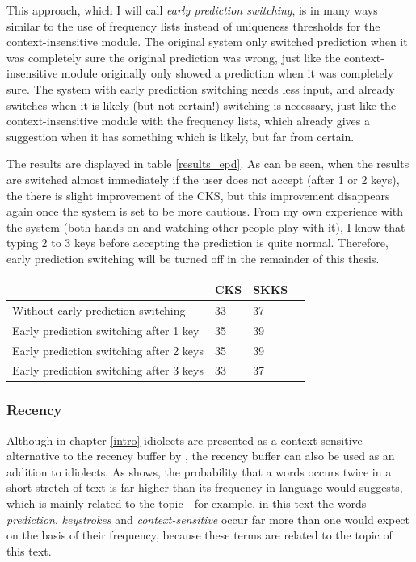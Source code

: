 \documentclass[12pt]{article}
\let\originaltable\table
\let\endoriginaltable\endtable
\renewenvironment{table}[1][ht]{%
  \originaltable[#1]
  \centering}%
  {\endoriginaltable}
\begin{document}
This approach, which I will call \emph{early prediction switching}, is in many ways similar to the use of frequency lists instead of uniqueness thresholds for the context-insensitive module. The original system only switched prediction when it was completely sure the original prediction was wrong, just like the context-insensitive module originally only showed a prediction when it was completely sure. The system with early prediction switching needs less input, and already switches when it is likely (but not certain!) switching is necessary, just like the context-insensitive module with the frequency lists, which already gives a suggestion when it has something which is likely, but far from certain.

The results are displayed in table \ref{results_epd}. As can be seen, when the results are switched almost immediately if the user does not accept (after 1 or 2 keys), the there is slight improvement of the CKS, but this improvement disappears again once the system is set to be more cautious. From my own experience with the system (both hands-on and watching other people play with it), I know that typing 2 to 3 keys before accepting the prediction is quite normal. Therefore, early prediction switching will be turned off in the remainder of this thesis.

\begin{table}[h]
\begin{tabular}{l|lll} 

&CKS&SKKS\\
\hline
Without early prediction switching&33&37\\
Early prediction switching after 1 key&35&39\\
Early prediction switching after 2 keys&35&39\\
Early prediction switching after 3 keys&33&37\\
\end{tabular} 
\caption{Percentage of keystrokes saved with and without early prediction switching.} \label{results_epd}
\end{table}

\subsubsection{Recency} \label{rb}

Although in chapter \ref{intro} idiolects are presented as a context-sensitive alternative to the recency buffer by , the recency buffer can also be used as an addition to idiolects. As  shows, the probability that a words occurs twice in a short stretch of text is far higher than its  frequency in language would suggests, which is mainly related to the topic - for example, in this text the words \emph{prediction}, \emph{keystrokes} and \emph{context-sensitive}  occur far more than one would expect on the basis of their frequency, because these terms are related to the topic of this text. 
\end{document}
